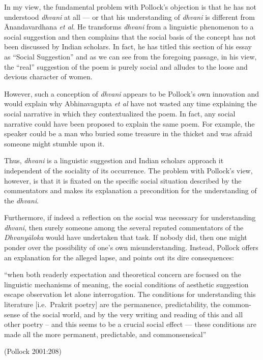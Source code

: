 In my view, the fundamental problem with Pollock's objection is that he has not understood \textsl{dhvani} at all --- or that his understanding of \textsl{dhvani} is different from Ānandavardhana \textsl{et al}. He transforms \textsl{dhvani} from a linguistic phenomenon to a social suggestion and then complains that the social basis of the concept has not been discussed by Indian scholars. In fact, he has titled this section of his essay as ``Social Suggestion'' and as we can see from the foregoing passage, in his view, the ``real'' suggestion of the poem is purely social and alludes to the loose and devious character of women. 

However, such a conception of \textsl{dhvani} appears to be Pollock's own innovation and would explain why Abhinavagupta \textsl{et al} have not wasted any time explaining the social narrative in which they contextualized the poem. In fact, any social narrative could have been proposed to explain the same poem. For example, the speaker could be a man who buried some treasure in the thicket and was afraid someone might stumble upon it. 

Thus, \textsl{dhvani} is a linguistic suggestion and Indian scholars approach it independent of the sociality of its occurrence. The problem with Pollock's view, however, is that it is fixated on the specific social situation described by the commentators and makes its explanation a precondition for the understanding of the \textsl{dhvani}. 
\eject

Furthermore, if indeed a reflection on the social was necessary for understanding \textsl{dhvani}, then surely someone among the several reputed commentators of the \textsl{Dhvanyāloka} would have undertaken that task. If nobody did, then one might ponder over the possibility of one's own misunderstanding. Instead, Pollock offers an explanation for the alleged lapse, and points out its dire consequences: 

\begin{myquote}
``when both readerly expectation and theoretical concern are focused on the linguistic mechanisms of meaning, the social conditions of aesthetic suggestion escape observation let alone interrogation. The conditions for understanding this literature [i.e.\ Prakrit poetry] are the permanence, predictability, the common-sense of the social world, and by the very writing and reading of this and all other poetry – and this seems to be a crucial social effect --- these conditions are made all the more permanent, predictable, and commonsensical''

\hfill (Pollock 2001:208)
\end{myquote}

